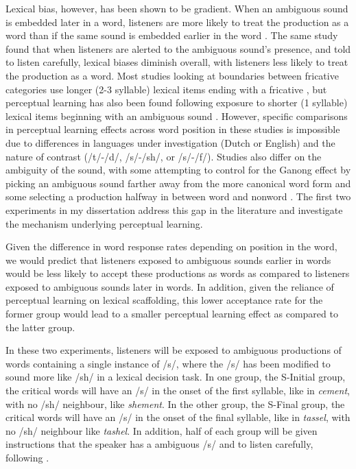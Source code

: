 \documentclass[11pt]{article} %
\begin{document}
Lexical bias, however, has been shown to be gradient.  When an ambiguous sound is embedded later in a word, listeners are more likely to treat the production as a word than if the same sound is embedded earlier in the word \citep{Pitt2012}.  The same study found that when listeners are alerted to the ambiguous sound's presence, and told to listen carefully, lexical biases diminish overall, with listeners less likely to treat the production as a word.    Most studies looking at boundaries between fricative categories use longer (2-3 syllable) lexical items ending with a fricative \citep{Norris2003}, but perceptual learning has also been found following exposure to shorter (1 syllable) lexical items beginning with an ambiguous sound \citep{Clare2014}.  However, specific comparisons in perceptual learning effects across word position in these studies is impossible due to differences in languages under investigation (Dutch or English) and the nature of contrast (/t/-/d/, /s/-/sh/, or /s/-/f/). Studies also differ on the ambiguity of the sound, with some attempting to control for the Ganong effect by picking an ambiguous sound farther away from the more canonical word form \citep{Reinisch2013} and some selecting a production halfway in between word and nonword \citep{Norris2003}.  The first two experiments in my dissertation address this gap in the literature and investigate the mechanism underlying perceptual learning.

Given the difference in word response rates depending on position in the word, we would predict that listeners exposed to ambiguous sounds earlier in words would be less likely to accept these productions as words as compared to listeners exposed to ambiguous sounds later in words.  In addition, given the reliance of perceptual learning on lexical scaffolding, this lower acceptance rate for the former group would lead to a smaller perceptual learning effect as compared to the latter group.

In these two experiments, listeners will be exposed to ambiguous productions of words containing a single instance of /s/, where the /s/ has been modified to sound more like /sh/ in a lexical decision task.  In one group, the S-Initial group, the critical words will have an /s/ in the onset of the first syllable, like in \emph{cement}, with no /sh/ neighbour, like \emph{shement}.  In the other group, the S-Final group, the critical words will have an /s/ in the onset of the final syllable, like in \emph{tassel}, with no /sh/ neighbour like \emph{tashel}.  In addition, half of each group will be given instructions that the speaker has a ambiguous /s/ and to listen carefully, following \citet{Pitt2012}.
\end{document}
